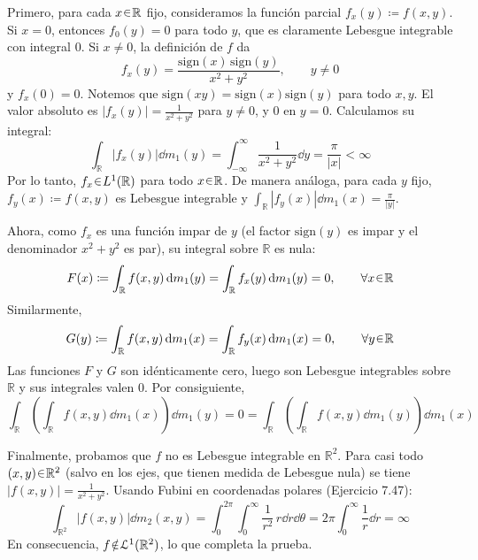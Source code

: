 \begin{sol}
Primero, para cada $x \en \mathbb{R}$ fijo, consideramos la función parcial $f_x(y) \coloneq f(x,y)$. 
Si $x = 0$, entonces $f_0(y) = 0$ para todo $y$, que es claramente Lebesgue integrable con integral $0$.
Si $x \neq 0$, la definición de $f$ da
\[
f_x(y) = \frac{\text{sign}(x)\,\text{sign}(y)}{x^2+y^2}, \qquad y \neq 0
\]
y $f_x(0)=0$. Notemos que $\text{sign}(xy) = \text{sign}(x)\text{sign}(y)$ para todo $x,y$.
El valor absoluto es $|f_x(y)| = \frac{1}{x^2+y^2}$ para $y \neq 0$, y $0$ en $y=0$. Calculamos su integral:
\[
\int_{\mathbb{R}} |f_x(y)| \dd{m_1(y)}
= \int_{-\infty}^{\infty} \frac{1}{x^2+y^2}\dd{y}
= \frac{\pi}{|x|} < \infty
\]
Por lo tanto, $f_x \en L^1(\mathbb{R})$ para todo $x \en \mathbb{R}$. 
De manera análoga, para cada $y$ fijo, $f_y(x) \coloneq f(x,y)$ es Lebesgue integrable y
$\int_{\mathbb{R}} |f_y(x)| \dd{m_1(x)} = \frac{\pi}{|y|}$.

Ahora, como $f_x$ es una función impar de $y$ (el factor $\text{sign}(y)$ es impar y el denominador $x^2+y^2$ es par), su integral sobre $\mathbb{R}$ es nula:
\[
F(x) \coloneq \int_{\mathbb{R}} f(x,y) \dd{m_1(y)} = \int_{\mathbb{R}} f_x(y) \dd{m_1(y)} = 0, \qquad \forall x \en \mathbb{R}
\]
Similarmente,
\[
G(y) \coloneq \int_{\mathbb{R}} f(x,y) \dd{m_1(x)} = \int_{\mathbb{R}} f_y(x) \dd{m_1(x)} = 0, \qquad \forall y \en \mathbb{R}
\]
Las funciones $F$ y $G$ son idénticamente cero, luego son Lebesgue integrables sobre $\mathbb{R}$ y sus integrales valen $0$. Por consiguiente,
\[
\int_{\mathbb{R}} \left( \int_{\mathbb{R}} f(x,y) \dd{m_1(x)} \right) \dd{m_1(y)}
= 0
= \int_{\mathbb{R}} \left( \int_{\mathbb{R}} f(x,y) \dd{m_1(y)} \right) \dd{m_1(x)}
\]

Finalmente, probamos que $f$ no es Lebesgue integrable en $\mathbb{R}^2$. 
Para casi todo $(x,y) \en \mathbb{R}^2$ (salvo en los ejes, que tienen medida de Lebesgue nula) se tiene $|f(x,y)| = \frac{1}{x^2+y^2}$. 
Usando Fubini en coordenadas polares (Ejercicio 7.47):
\[
\int_{\mathbb{R}^2} |f(x,y)| \dd{m_2(x,y)}
= \int_{0}^{2\pi} \int_{0}^{\infty} \frac{1}{r^2}\, r \dd{r} \dd{\theta}
= 2\pi \int_{0}^{\infty} \frac{1}{r}\dd{r}
= \infty
\]
En consecuencia, $f \noten \mathcal{L}^1(\mathbb{R}^2)$, lo que completa la prueba.
\end{sol}
